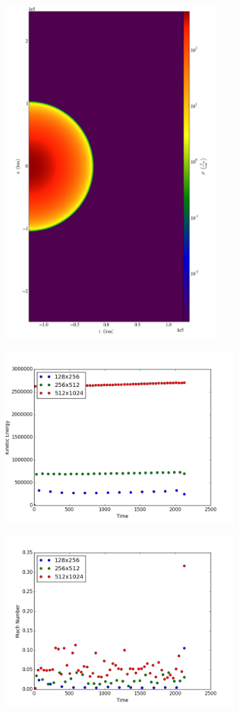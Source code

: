 \documentclass[11pt]{article}
\begin{document}
\includegraphics[width=0.60\textwidth]{_Slice_theta_density.png}

\includegraphics[width=0.65\textwidth]{KEvsT.png}

\includegraphics[width=0.65\textwidth]{mNumber.png}
\end{document}
